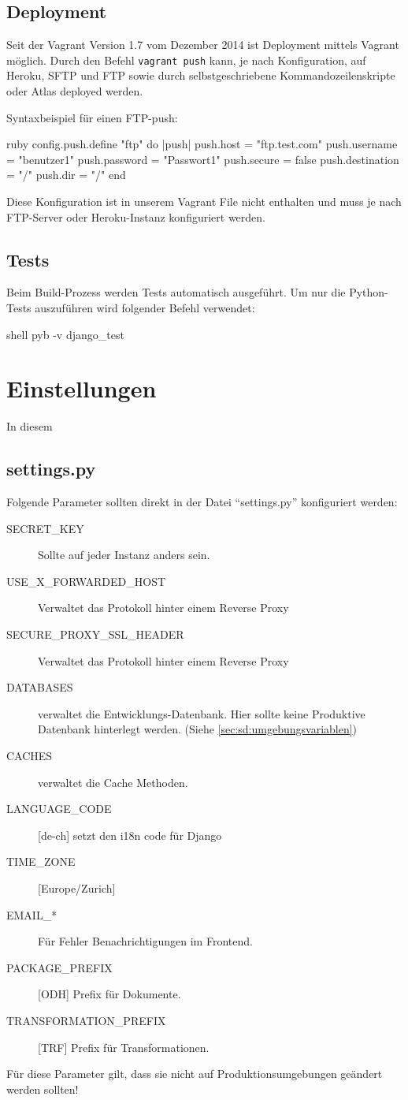 \subsection{Deployment}
Seit der Vagrant Version 1.7 vom Dezember 2014 ist Deployment mittels Vagrant möglich. Durch den Befehl \texttt{vagrant push} kann, je nach Konfiguration, auf Heroku, SFTP und FTP sowie durch selbstgeschriebene Kommandozeilenskripte oder Atlas deployed werden.

Syntaxbeispiel für einen FTP-push: \cite{vagrant-deployment}
\begin{src}{ruby}
config.push.define "ftp" do |push|
  push.host = "ftp.test.com"
  push.username = "benutzer1"
  push.password = "Passwort1"
  push.secure = false
  push.destination = "/"
  push.dir = "/"
end
\end{src}
Diese Konfiguration ist in unserem Vagrant File nicht enthalten und muss je nach FTP-Server oder Heroku-Instanz konfiguriert werden.

\subsection{Tests}
Beim Build-Prozess werden Tests automatisch ausgeführt. Um nur die Python-Tests auszuführen wird folgender Befehl verwendet:
\begin{src}{shell}
pyb -v django_test
\end{src}
\section{Einstellungen}
In diesem
\subsection{settings.py}
Folgende Parameter sollten direkt in der Datei ``settings.py'' konfiguriert werden:
\begin{description}
\item[SECRET\_KEY] Sollte auf jeder Instanz anders sein.
\item[USE\_X\_FORWARDED\_HOST] Verwaltet das Protokoll hinter einem Reverse Proxy
\item[SECURE\_PROXY\_SSL\_HEADER] Verwaltet das Protokoll hinter einem Reverse Proxy
\item[DATABASES] verwaltet die Entwicklungs-Datenbank. Hier sollte keine Produktive Datenbank hinterlegt werden. (Siehe \cref{sec:sd:umgebungsvariablen})
\item[CACHES] verwaltet die Cache Methoden.
\item[LANGUAGE\_CODE]{[}de-ch{]} setzt den i18n code für Django
\item[TIME\_ZONE]{[}Europe/Zurich{]}

\item[EMAIL\_*] Für Fehler Benachrichtigungen im Frontend.
\item[PACKAGE\_PREFIX]{[}ODH{]} Prefix für Dokumente. 
\item[TRANSFORMATION\_PREFIX]{[}TRF{]} Prefix für Transformationen.
\end{description}
Für diese Parameter gilt, dass sie nicht auf Produktionsumgebungen geändert werden sollten!
